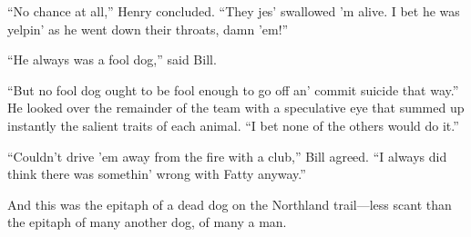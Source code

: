 “No chance at all,” Henry concluded. “They jes’ swallowed ’m alive. I
bet he was yelpin’ as he went down their throats, damn ’em!”

“He always was a fool dog,” said Bill.

“But no fool dog ought to be fool enough to go off an’ commit suicide
that way.” He looked over the remainder of the team with a speculative
eye that summed up instantly the salient traits of each animal. “I bet
none of the others would do it.”

“Couldn’t drive ’em away from the fire with a club,” Bill agreed. “I
always did think there was somethin’ wrong with Fatty anyway.”

And this was the epitaph of a dead dog on the Northland trail—less
scant than the epitaph of many another dog, of many a man.